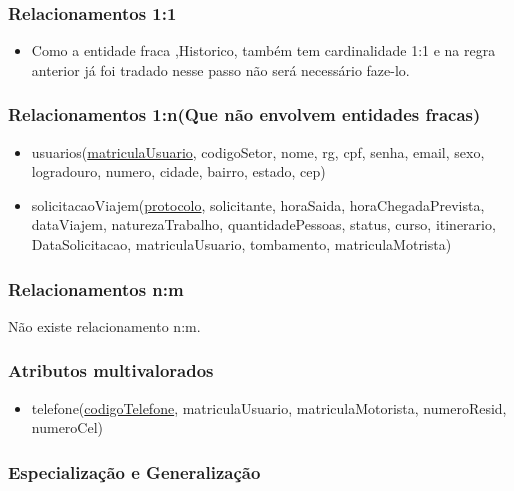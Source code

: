 \documentclass[11pt]{article}
\begin{document}
\subsubsection{Relacionamentos 1:1}
\begin{itemize}

\item Como a entidade fraca ,Historico, também tem cardinalidade 1:1 e na regra anterior já foi tradado nesse passo não será necessário faze-lo.
\end{itemize}

\subsubsection{Relacionamentos 1:n(Que não envolvem entidades fracas)}
\begin{itemize}

\item usuarios(\underline{matriculaUsuario}, codigoSetor, nome, rg, cpf, senha,
email, sexo, logradouro, numero, cidade, bairro, estado, cep)

\item solicitacaoViajem(\underline{protocolo}, solicitante, horaSaida, horaChegadaPrevista, dataViajem, naturezaTrabalho, quantidadePessoas, status, curso, itinerario, DataSolicitacao, matriculaUsuario, tombamento, matriculaMotrista)

\end{itemize}

\subsubsection{Relacionamentos n:m}
Não existe relacionamento n:m.

\subsubsection{Atributos multivalorados}
\begin{itemize}

\item telefone(\underline{codigoTelefone}, matriculaUsuario, matriculaMotorista, numeroResid, numeroCel)

\end{itemize}

\subsubsection{Especialização e Generalização}
\end{document}

